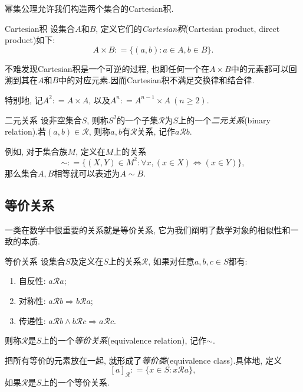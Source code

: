 幂集公理允许我们构造两个集合的Cartesian积.

\begin{definition}{Cartesian积}
	设集合$A$和$B$, 定义它们的\textit{Cartesian积}(Cartesian product,  direct product)如下: $$A \times B : = \{ (a, b): a \in A, b \in B \}.$$
\end{definition}
\begin{remark}
	不难发现Cartesian积是一个可逆的过程, 也即任何一个在$A \times B$中的元素都可以回溯到其在$A$和$B$中的对应元素.因而Cartesian积不满足交换律和结合律.
\end{remark}
\begin{remark}
	特别地, 记$A^2: =A \times A$, 以及$A^n : = A^{n-1} \times A~(n \geq 2)$.
\end{remark}

\begin{definition}{二元关系}
	设非空集合$S$, 则称$S^2$的一个子集$\mathcal{R}$为$S$上的一个\textit{二元关系}(binary relation).若$(a, b) \in \mathcal{R}$, 则称$a, b$有$\mathcal{R}$关系, 记作$a\mathcal{R}b$.
\end{definition}

例如, 对于集合族$M$, 定义在$M$上的关系$$\boldsymbol{\sim} : = \{ (X, Y) \in M^2 :  \forall x, (x \in X) \Leftrightarrow (x \in Y) \}, $$
那么集合$A, B$相等就可以表述为$A \boldsymbol{\sim} B$.

\subsection{等价关系}

一类在数学中很重要的关系就是等价关系, 它为我们阐明了数学对象的相似性和一致的本质.

\begin{definition}{等价关系}
	设集合$S$及定义在$S$上的关系$\mathcal{R}$, 如果对任意$a, b, c \in S$都有: 
	\begin{enumerate}
		\item 自反性: $a\mathcal{R} a$; 
		\item 对称性: $a\mathcal{R} b \Rightarrow b\mathcal{R} a$; 
		\item 传递性: $a\mathcal{R} b \wedge b\mathcal{R} c \Rightarrow a\mathcal{R} c$.
	\end{enumerate}
	则称$\mathcal{R}$是$S$上的一个\textit{等价关系}(equivalence relation), 记作$\sim$.
\end{definition}

把所有等价的元素放在一起, 就形成了\textit{等价类}(equivalence class).具体地, 定义$$[a]_{\mathcal{R}} : = \{ x \in S: x\mathcal{R}a \}, $$如果$\mathcal{R}$是$S$上的一个等价关系.

